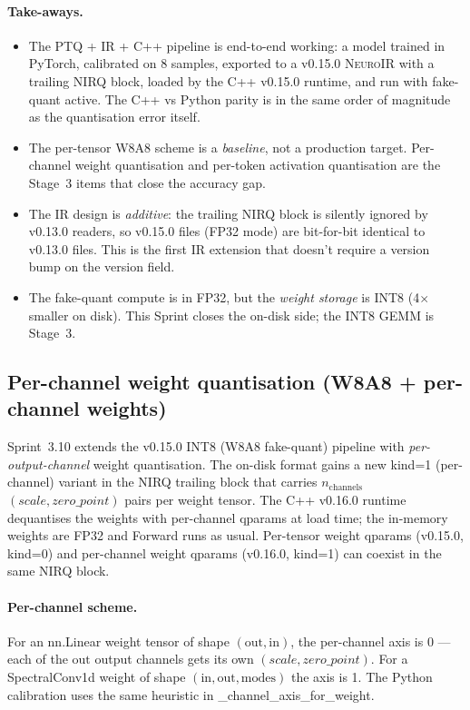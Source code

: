 \documentclass[10pt,twocolumn]{article}
\renewcommand{\texttt}[1]{{\normalfont\ttfamily #1}\normalfont\rmfamily}
\newcommand{\neuroir}{\textsc{NeuroIR}}
\begin{document}
\paragraph{Take-aways.}
\begin{itemize}
\item The PTQ + IR + C{++} pipeline is end-to-end
working: a model trained in PyTorch, calibrated on 8
samples, exported to a v0.15.0 \neuroir{} with a
trailing \texttt{NIRQ} block, loaded by the
C{++} v0.15.0 runtime, and run with fake-quant
active.  The C{++} vs Python parity is in the same
order of magnitude as the quantisation error itself.
\item The per-tensor W8A8 scheme is a \emph{baseline},
not a production target.  Per-channel weight
quantisation and per-token activation quantisation
are the Stage~3 items that close the accuracy gap.
\item The IR design is \emph{additive}: the trailing
\texttt{NIRQ} block is silently ignored by v0.13.0
readers, so v0.15.0 files (FP32 mode) are
bit-for-bit identical to v0.13.0 files.  This is the
first IR extension that doesn't require a version
bump on the \texttt{version} field.
\item The fake-quant compute is in FP32, but the
\emph{weight storage} is INT8 (4$\times$ smaller on
disk).  This Sprint closes the on-disk side; the
INT8 GEMM is Stage~3.
\end{itemize}

\subsection{Per-channel weight quantisation (W8A8 + per-channel weights)}
\label{sec:int8-per-channel}

Sprint~3.10 extends the v0.15.0 INT8 (W8A8 fake-quant)
pipeline with \emph{per-output-channel} weight
quantisation.  The on-disk format gains a new
\texttt{kind=1} (per-channel) variant in the NIRQ
trailing block that carries $n_{\mathrm{channels}}$
$(scale, zero\_point)$ pairs per weight tensor.  The
C{++} v0.16.0 runtime dequantises the weights with
per-channel qparams at load time; the in-memory weights
are FP32 and \texttt{Forward} runs as usual.  Per-tensor
weight qparams (v0.15.0, \texttt{kind=0}) and per-channel
weight qparams (v0.16.0, \texttt{kind=1}) can coexist in
the same NIRQ block.

\paragraph{Per-channel scheme.}
For an \texttt{nn.Linear} weight tensor of shape
$(\mathrm{out}, \mathrm{in})$, the per-channel axis is
0 --- each of the $\mathrm{out}$ output channels gets
its own $(scale, zero\_point)$.  For a
\texttt{SpectralConv1d} weight of shape
$(\mathrm{in}, \mathrm{out}, \mathrm{modes})$ the axis
is 1.  The Python calibration uses the same heuristic
in \texttt{\_channel\_axis\_for\_weight}.
\end{document}
